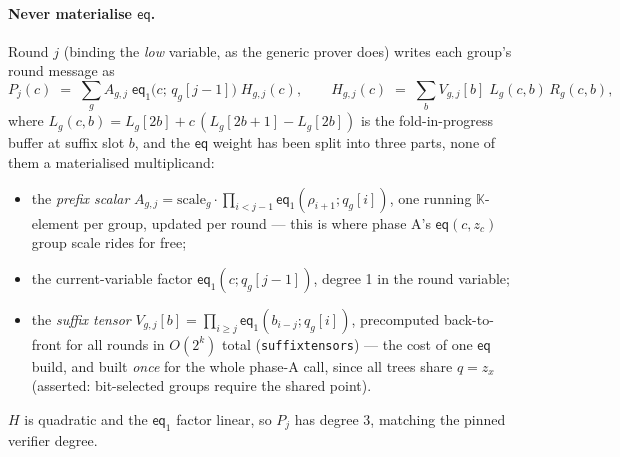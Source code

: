 \documentclass[11pt]{article}
\newcommand{\K}{\mathbb{K}}            %
\newcommand{\eq}{\mathsf{eq}}
\newcommand{\code}[1]{{\def\_{\textunderscore\allowbreak}\texttt{#1}}}
\theoremstyle{definition}
\begin{document}
\paragraph{Never materialise $\eq$.}
Round $j$ (binding the \emph{low} variable, as the generic prover does)
writes each group's round message as
\[
  P_j(c) \;=\; \sum_g A_{g,j}\;\eq_1\!\big(c;\, q_g[j-1]\big)\;
  H_{g,j}(c),
  \qquad
  H_{g,j}(c) \;=\; \sum_b V_{g,j}[b]\; L_g(c, b)\, R_g(c, b),
\]
where $L_g(c, b) = L_g[2b] + c\,(L_g[2b{+}1] - L_g[2b])$ is the
fold-in-progress buffer at suffix slot $b$, and the $\eq$ weight has
been split into three parts, none of them a materialised multiplicand:
\begin{itemize}[itemsep=1pt]
\item the \emph{prefix scalar}
  $A_{g,j} = \mathrm{scale}_g\cdot\prod_{i<j-1}\eq_1(\rho_{i+1};
  q_g[i])$, one running $\K$-element per group, updated per round ---
  this is where phase A's $\eq(c, z_c)$ group scale rides for free;
\item the current-variable factor $\eq_1(c; q_g[j-1])$, degree 1 in the
  round variable;
\item the \emph{suffix tensor}
  $V_{g,j}[b] = \prod_{i\ge j}\eq_1(b_{i-j}; q_g[i])$, precomputed
  back-to-front for all rounds in $O(2^k)$ total (\code{suffix\_tensors})
  --- the cost of one $\eq$ build, and built \emph{once} for the whole
  phase-A call, since all trees share $q = z_x$ (asserted:
  bit-selected groups require the shared point).
\end{itemize}
$H$ is quadratic and the $\eq_1$ factor linear, so $P_j$ has degree 3,
matching the pinned verifier degree.
\end{document}
